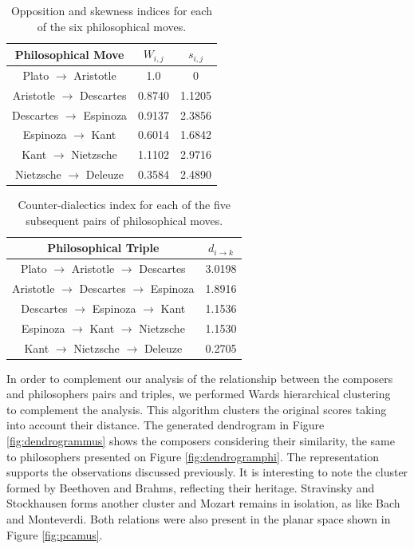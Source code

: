 \documentclass[
 aip,
 jmp,
 amsmath,amssymb,
 reprint,
]{revtex4-1}
\begin{document}
\begin{table}%
\caption{\label{tab:tableOIphi}Opposition and skewness indices for each
of the six philosophical moves.  }

\begin{tabular}{|c||c|c|}
\hline
Philosophical Move & $W_{i,j}$ & $s_{i,j}$ \\
\hline \hline
Plato $\rightarrow$ Aristotle     & 1.0    & 0 \\
Aristotle $\rightarrow$ Descartes & 0.8740 & 1.1205 \\
Descartes $\rightarrow$ Espinoza  & 0.9137 & 2.3856 \\
Espinoza $\rightarrow$ Kant       & 0.6014 & 1.6842 \\
Kant $\rightarrow$ Nietzsche      & 1.1102 & 2.9716 \\
Nietzsche $\rightarrow$ Deleuze   & 0.3584 & 2.4890 \\
\hline
\end{tabular}
\end{table}

\begin{table}%
\caption{\label{tab:tableEphi} Counter-dialectics index for each
of the five subsequent pairs of philosophical moves.  }

\begin{tabular}{|c||c|}
\hline
Philosophical Triple & $d_{i \rightarrow k}$ \\
\hline \hline
Plato $\rightarrow$ Aristotle $\rightarrow$ Descartes    & 3.0198 \\
Aristotle $\rightarrow$ Descartes $\rightarrow$ Espinoza & 1.8916 \\
Descartes $\rightarrow$ Espinoza $\rightarrow$ Kant      & 1.1536 \\
Espinoza $\rightarrow$ Kant $\rightarrow$ Nietzsche      & 1.1530 \\
Kant $\rightarrow$ Nietzsche $\rightarrow$ Deleuze       & 0.2705 \\
\hline
\end{tabular}
\end{table}

In order to complement our analysis of the relationship between the composers and philosophers pairs and triples, we performed Wards hierarchical
clustering~\cite{Ward} to complement the analysis. This algorithm clusters the original scores taking into
account their distance. The generated dendrogram in
Figure \ref{fig:dendrogrammus} shows the composers
considering their similarity, the same to philosophers presented on Figure \ref{fig:dendrogramphi}. The representation supports the
observations discussed previously. It is interesting to note the cluster
formed by Beethoven and Brahms, reflecting their heritage. Stravinsky
and Stockhausen forms another cluster and Mozart remains in isolation,
as like Bach and Monteverdi. Both relations were also present in the
planar space shown in Figure \ref{fig:pcamus}.
\end{document}
